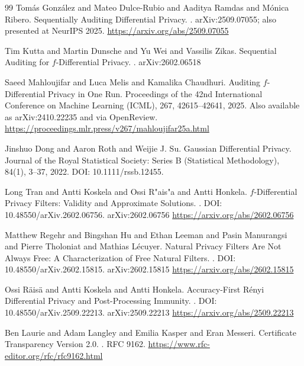 \documentclass[11pt]{article}
\begin{document}
\begin{thebibliography}{99}
Tom{\'a}s Gonz{\'a}lez and Mateo Dulce-Rubio and Aaditya Ramdas and M{\'o}nica Ribero.
\newblock Sequentially Auditing Differential Privacy.
.
\newblock arXiv:2509.07055; also presented at NeurIPS 2025.
\newblock \url{https://arxiv.org/abs/2509.07055}

Tim Kutta and Martin Dunsche and Yu Wei and Vassilis Zikas.
\newblock Sequential Auditing for $f$-Differential Privacy.
.
\newblock arXiv:2602.06518

Saeed Mahloujifar and Luca Melis and Kamalika Chaudhuri.
\newblock Auditing $f$-Differential Privacy in One Run.
\newblock Proceedings of the 42nd International Conference on Machine Learning (ICML), 267, 42615--42641, 2025.
\newblock Also available as arXiv:2410.22235 and via OpenReview.
\newblock \url{https://proceedings.mlr.press/v267/mahloujifar25a.html}

Jinshuo Dong and Aaron Roth and Weijie J. Su.
\newblock Gaussian Differential Privacy.
\newblock Journal of the Royal Statistical Society: Series B (Statistical Methodology), 84(1), 3--37, 2022.
\newblock DOI: 10.1111/rssb.12455.

Long Tran and Antti Koskela and Ossi R{"a}is{"a} and Antti Honkela.
\newblock $f$-Differential Privacy Filters: Validity and Approximate Solutions.
.
\newblock DOI: 10.48550/arXiv.2602.06756.
\newblock arXiv:2602.06756
\newblock \url{https://arxiv.org/abs/2602.06756}

Matthew Regehr and Bingshan Hu and Ethan Leeman and Pasin Manurangsi and Pierre Tholoniat and Mathias L{\'e}cuyer.
\newblock Natural Privacy Filters Are Not Always Free: A Characterization of Free Natural Filters.
.
\newblock DOI: 10.48550/arXiv.2602.15815.
\newblock arXiv:2602.15815
\newblock \url{https://arxiv.org/abs/2602.15815}

Ossi R{\"a}is{\"a} and Antti Koskela and Antti Honkela.
\newblock Accuracy-First R{\'e}nyi Differential Privacy and Post-Processing Immunity.
.
\newblock DOI: 10.48550/arXiv.2509.22213.
\newblock arXiv:2509.22213
\newblock \url{https://arxiv.org/abs/2509.22213}

Ben Laurie and Adam Langley and Emilia Kasper and Eran Messeri.
\newblock Certificate Transparency Version 2.0.
.
\newblock RFC 9162.
\newblock \url{https://www.rfc-editor.org/rfc/rfc9162.html}


\end{thebibliography}
\end{document}
